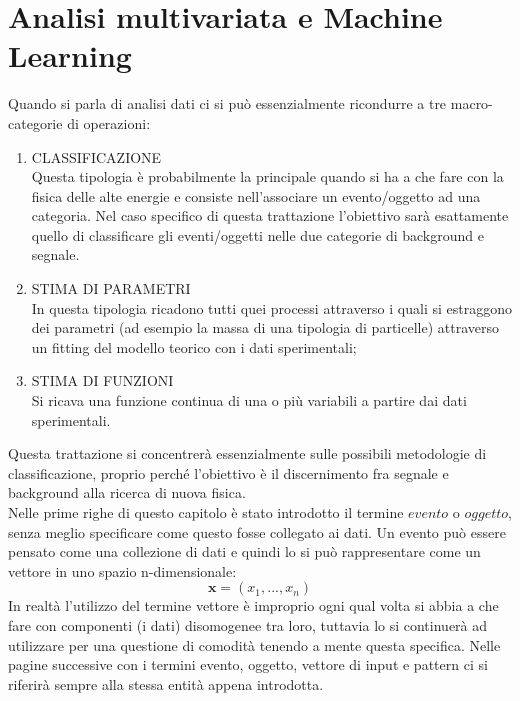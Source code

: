 \section{Analisi multivariata e Machine Learning}
\label{analisi multivariata e ML}

	Quando si parla di analisi dati ci si può essenzialmente ricondurre a tre macro-categorie di operazioni:

\begin{enumerate}
	\item CLASSIFICAZIONE \\
	Questa tipologia è probabilmente la principale quando si ha a che fare con la fisica delle alte energie e consiste nell'associare un evento/oggetto  ad una categoria. Nel caso specifico di questa trattazione l'obiettivo sarà esattamente quello di classificare gli eventi/oggetti nelle due categorie di background e segnale.

	\item STIMA DI PARAMETRI \\
	In questa tipologia ricadono tutti quei processi attraverso i quali si estraggono dei parametri (ad esempio la massa di una tipologia di particelle) attraverso un fitting del modello teorico con i dati sperimentali;
	
	\item STIMA DI FUNZIONI \\
	Si ricava una funzione continua di una o più variabili a partire dai dati sperimentali.
\end{enumerate}

Questa trattazione si concentrerà essenzialmente sulle possibili metodologie di classificazione, proprio perché l'obiettivo è il discernimento fra segnale e background alla ricerca di nuova fisica. \\
Nelle prime righe di questo capitolo è stato introdotto il termine $\textit{evento}$ o $\textit{oggetto}$, senza meglio specificare come questo fosse collegato ai dati. Un evento può essere pensato come una collezione di dati e quindi lo si può rappresentare come un vettore in uno spazio n-dimensionale: 
\begin{equation}
\textbf{x} = (x_{1},...,x_{n})
\end{equation}
In realtà l'utilizzo del termine vettore è improprio ogni qual volta si abbia a che fare con componenti (i dati) disomogenee tra loro, tuttavia lo si continuerà ad utilizzare per una questione di comodità tenendo a mente questa specifica. Nelle pagine successive con i termini evento, oggetto, vettore di input e pattern ci si riferirà sempre alla stessa entità appena introdotta. \\